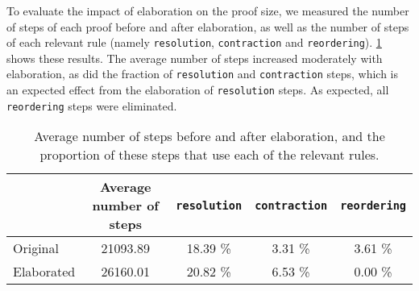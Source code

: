 To evaluate the impact of elaboration on the proof size, we measured the number of steps of each proof before and after elaboration, as well as the number of steps of each relevant rule (namely \texttt{resolution}, \texttt{contraction} and \texttt{reordering}). \cref{tab:elaboration-impact} shows these results. The average number of steps increased moderately with elaboration, as did the fraction of \texttt{resolution} and \texttt{contraction} steps, which is an expected effect from the elaboration of \texttt{resolution} steps. As expected, all \texttt{reordering} steps were eliminated.

\begin{table}%
    \begin{tabular}{|l c c c c|}
    \hline
    & Average number of steps & \texttt{resolution} & \texttt{contraction} & \texttt{reordering} \\ \hline
    Original   & 21093.89 & 18.39 \% & 3.31 \% & 3.61 \% \\
    Elaborated & 26160.01 & 20.82 \% & 6.53 \% & 0.00 \% \\
    \hline
    \end{tabular}
    \caption{Average number of steps before and after elaboration, and the proportion of these steps that use each of the relevant rules.}
    \label{tab:elaboration-impact}
\end{table}

